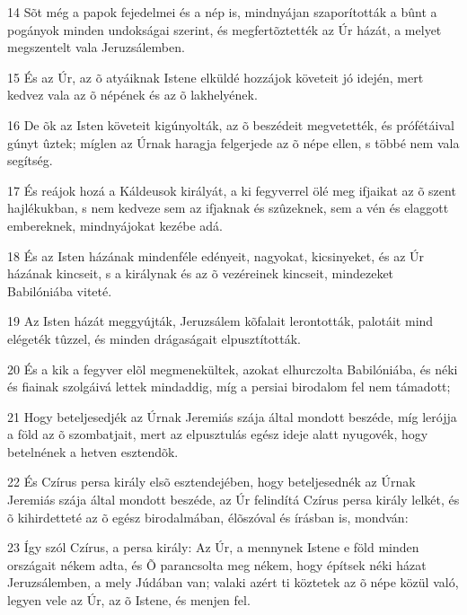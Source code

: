 \par 14 Sõt még a papok fejedelmei és a nép is, mindnyájan szaporították a bûnt a pogányok minden undokságai szerint, és megfertõztették az Úr házát, a melyet megszentelt vala Jeruzsálemben.
\par 15 És az Úr, az õ atyáiknak Istene elküldé hozzájok követeit jó idején, mert kedvez vala az õ népének és az õ lakhelyének.
\par 16 De õk az Isten követeit kigúnyolták, az õ beszédeit megvetették, és prófétáival gúnyt ûztek; míglen az Úrnak haragja felgerjede az õ népe ellen, s többé nem vala segítség.
\par 17 És reájok hozá a Káldeusok királyát, a ki fegyverrel ölé meg ifjaikat az õ szent hajlékukban, s nem kedveze sem az ifjaknak és szûzeknek, sem a vén és elaggott embereknek, mindnyájokat kezébe adá.
\par 18 És az Isten házának mindenféle edényeit, nagyokat, kicsinyeket, és az Úr házának kincseit, s a királynak és az õ vezéreinek kincseit, mindezeket Babilóniába viteté.
\par 19 Az Isten házát meggyújták, Jeruzsálem kõfalait lerontották, palotáit mind elégeték tûzzel, és minden drágaságait elpusztították.
\par 20 És a kik a fegyver elõl megmenekültek, azokat elhurczolta Babilóniába, és néki és fiainak szolgáivá lettek mindaddig, míg a persiai birodalom fel nem támadott;
\par 21 Hogy beteljesedjék az Úrnak Jeremiás szája által mondott beszéde, míg lerójja a föld az õ szombatjait, mert az elpusztulás egész ideje alatt nyugovék, hogy betelnének a  hetven esztendõk.
\par 22 És Czírus persa király elsõ esztendejében, hogy beteljesednék az Úrnak Jeremiás szája által mondott beszéde, az Úr felindítá Czírus persa király lelkét, és õ kihirdetteté az õ egész birodalmában, élõszóval és írásban is, mondván:
\par 23 Így szól Czírus, a persa király: Az Úr, a mennynek Istene e föld minden országait nékem adta, és Õ parancsolta meg nékem, hogy építsek néki házat Jeruzsálemben, a mely Júdában van; valaki azért ti köztetek az õ népe közül való, legyen vele az Úr, az õ Istene, és menjen fel.



